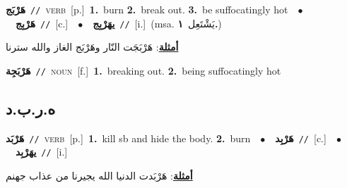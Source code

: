 \documentclass[10pt,a4paper,twoside]{article} %
\begin{document}
\begin{multicols}{2}
{\setlength\topsep{0pt}\textbf{\foreignlanguage{arabic}{هَرْبَج}}\ {\color{gray}\texttt{//}\color{black}}\ \textsc{verb}\ [p.]\ \textbf{1.}~burn  \textbf{2.}~break out.  \textbf{3.}~be suffocatingly hot\ \ $\bullet$\ \ \setlength\topsep{0pt}\textbf{\foreignlanguage{arabic}{هَرْبِج}}\ {\color{gray}\texttt{//}\color{black}}\ [c.]\ \ $\bullet$\ \ \setlength\topsep{0pt}\textbf{\foreignlanguage{arabic}{يهَرْبِج}}\ {\color{gray}\texttt{//}\color{black}}\ [i.]\ \color{gray}(msa. \foreignlanguage{arabic}{يَشْتَعِل}~\foreignlanguage{arabic}{\textbf{١.}})\color{black}\  \begin{flushright}\color{gray}\foreignlanguage{arabic}{\textbf{\underline{\foreignlanguage{arabic}{أمثلة}}}: هَرْبَجَت النّار وهَرْبَج الغاز والله سترنا}\end{flushright}\color{black}} \vspace{2mm}

{\setlength\topsep{0pt}\textbf{\foreignlanguage{arabic}{هَرْبَجِة}}\ {\color{gray}\texttt{//}\color{black}}\ \textsc{noun}\ [f.]\ \textbf{1.}~breaking out.  \textbf{2.}~being suffocatingly hot\ } \vspace{2mm}

\vspace{-3mm}
\subsection*{\color{blue}\foreignlanguage{arabic}{ه.ر.ب.د}\color{blue}{}} 

{\setlength\topsep{0pt}\textbf{\foreignlanguage{arabic}{هَرْبَد}}\ {\color{gray}\texttt{//}\color{black}}\ \textsc{verb}\ [p.]\ \textbf{1.}~kill sb and hide the body.  \textbf{2.}~burn\ \ $\bullet$\ \ \setlength\topsep{0pt}\textbf{\foreignlanguage{arabic}{هَرْبِد}}\ {\color{gray}\texttt{//}\color{black}}\ [c.]\ \ $\bullet$\ \ \setlength\topsep{0pt}\textbf{\foreignlanguage{arabic}{يهَرْبِد}}\ {\color{gray}\texttt{//}\color{black}}\ [i.]\  \begin{flushright}\color{gray}\foreignlanguage{arabic}{\textbf{\underline{\foreignlanguage{arabic}{أمثلة}}}: هَرْبَدت الدنيا الله يجيرنا من عذاب جهنم}\end{flushright}\color{black}} \vspace{2mm}


\end{multicols}
\end{document}
